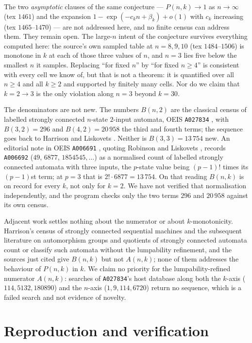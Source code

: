 \documentclass[11pt]{amsart}
\theoremstyle{remark}
\begin{document}
The two \emph{asymptotic} clauses of the same conjecture --- $P(n,k)\to1$ as $n\to\infty$
(tex $1461$) and the expansion $1-\exp(-c_kn+\beta_k)+o(1)$ with $c_k$ increasing (tex
$1465$--$1470$) --- are not addressed here, and no finite census can address them.  They
remain open.  The large-$n$ intent of the conjecture survives everything computed here: the
source's own sampled table at $n=8,9,10$ (tex $1484$--$1506$) is monotone in $k$ at each of
those three values of $n$, and $n=3$ lies five below the smallest $n$ it samples.  Replacing
``for fixed $n$'' by ``for fixed $n\ge4$'' is consistent with every cell we know of, but
that is not a theorem: it is quantified over all $n\ge4$ and all $k\ge2$ and supported by
finitely many cells.  Nor do we claim that $k=2\to3$ is the only violation along $n=3$
beyond $k=30$.

The denominators are not new.  The numbers $B(n,2)$ are the classical census of labelled
strongly connected $n$-state $2$-input automata, OEIS \texttt{A027834} \cite{OEIS}, with
$B(3,2)=296$ and $B(4,2)=20\,958$ the third and fourth terms; the sequence goes back to
Harrison \cite{Harrison} and Liskovets \cite{Liskovets}.  Neither is $B(3,3)=13\,754$ new.
An editorial note in OEIS \texttt{A006691} \cite{OEISb}, quoting Robinson \cite{Robinson}
and Liskovets \cite{Liskovets}, records \texttt{A006692} ($49$, $6877$, $1854545,\dots$) as
a normalised count of labelled strongly connected automata with three inputs, the $p$-state
value being $(p-1)!$ times its $(p-1)$st term; at $p=3$ that is $2!\cdot6877=13\,754$.  On
that reading $B(n,k)$ is on record for every $k$, not only for $k=2$.  We have not verified
that normalisation independently, and the program checks only the two terms $296$ and
$20\,958$ against its own census.

Adjacent work settles nothing about the numerator or about $k$-monotonicity.  Harrison's
census of strongly connected sequential machines \cite{HarrisonSCC} and the subsequent
literature on automorphism groups and quotients of strongly connected automata count or
classify such automata without the lumpability refinement, and the sources just cited give
$B(n,k)$ but not $A(n,k)$; none of them addresses the behaviour of $P(n,k)$ in $k$.  We
claim no priority for the lumpability-refined numerator $A(n,k)$: searches of
\texttt{A027834}'s host database along both the $k$-axis ($114,5132,180890$) and the
$n$-axis ($1,9,114,6720$) return no sequence, which is a failed search and not evidence of
novelty.

\section{Reproduction and verification}
\label{sec:verify}
\end{document}

